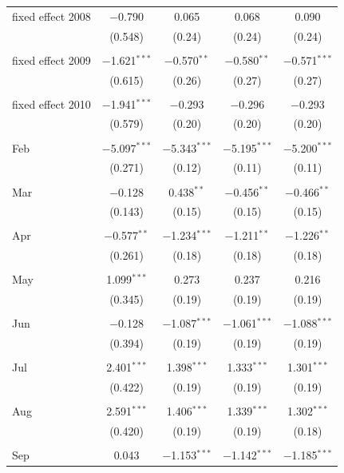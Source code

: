 \documentclass[titlepage, 11pt]{article}
\begin{document}
\begin{table}[!htbp]
{\begin{tabular}{@{\extracolsep{5pt}}lcccc}
 fixed effect 2008 & $-$0.790 &    0.065& 0.068 &  0.090  \\ 
  & (0.548) & (0.24) & (0.24) & (0.24) \\ 
  & & & & \\ 
fixed effect 2009 & $-$1.621$^{***}$ &   $-$0.570$^{**}$ & $-$0.580$^{**}$ & $-$0.571$^{***}$ \\ 
  & (0.615) & (0.26) & (0.27) & (0.27) \\ 
  & & & & \\ 
fixed effect 2010 & $-$1.941$^{***}$ &  $-$0.293 & $-$0.296 & $-$0.293 \\ 
  & (0.579) & (0.20) & (0.20) & (0.20) \\ 
  & & & & \\ 
Feb & $-$5.097$^{***}$ & $-$5.343$^{***}$ & $-$5.195$^{***}$ & $-$5.200$^{***}$ \\ 
  & (0.271) & (0.12) & (0.11) & (0.11) \\ 
  & & & & \\ 
 Mar & $-$0.128 & 0.438$^{**}$ & $-$0.456$^{**}$ & $-$0.466$^{**}$ \\ 
  & (0.143) & (0.15) & (0.15) & (0.15) \\ 
  & & & & \\ 
 Apr & $-$0.577$^{**}$ & $-$1.234$^{***}$ & $-$1.211$^{**}$ & $-$1.226$^{**}$ \\ 
  & (0.261) & (0.18)  & (0.18) & (0.18) \\ 
  & & & & \\ 
 May & 1.099$^{***}$ & 0.273 & 0.237 & 0.216 \\ 
  & (0.345) & (0.19) & (0.19) & (0.19) \\ 
  & & & & \\ 
 Jun & $-$0.128 & $-$1.087$^{***}$ & $-$1.061$^{***}$ & $-$1.088$^{***}$ \\ 
  & (0.394) & (0.19) & (0.19) & (0.19) \\ 
  & & & & \\ 
 Jul & 2.401$^{***}$ & 1.398$^{***}$ & 1.333$^{***}$ & 1.301$^{***}$ \\ 
  & (0.422) & (0.19) & (0.19) & (0.19) \\ 
  & & & & \\ 
 Aug & 2.591$^{***}$ & 1.406$^{***}$ & 1.339$^{***}$ & 1.302$^{***}$ \\ 
  & (0.420) & (0.19) & (0.19) & (0.18) \\ 
  & & & & \\ 
 Sep & 0.043 & $-$1.153$^{***}$ & $-$1.142$^{***}$ & $-$1.185$^{***}$ \\ 

\end{tabular}}
\end{table}
\end{document}
